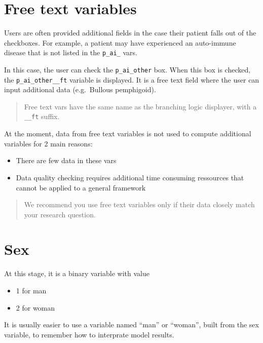 \documentclass[
]{book}
\begin{document}
\hypertarget{freetext_var}{%
\section{Free text variables}\label{freetext_var}}

Users are often provided additional fields in the case their patient
falls out of the checkboxes. For example, a patient may have experienced
an auto-immune disease that is not listed in the \texttt{p\_ai\_} vars.

In this case, the user can check the \texttt{p\_ai\_other} box. When this box is
checked, the \texttt{p\_ai\_other\_\_ft} variable is displayed. It is a free text
field where the user can input additional data (e.g.~Bullous
pemphigoid).

\begin{quote}
Free text vars have the same name as the branching logic displayer,
with a \texttt{\_\_ft} suffix.
\end{quote}

At the moment, data from free text variables is not used to compute
additional variables for 2 main reasons:

\begin{itemize}
\item
  There are few data in these vars
\item
  Data quality checking requires additional time consuming ressources
  that cannot be applied to a general framework
\end{itemize}

\begin{quote}
We recommend you use free text variables only if their data closely
match your research question.
\end{quote}

\hypertarget{sex}{%
\section{Sex}\label{sex}}

At this stage, it is a binary variable with value

\begin{itemize}
\item
  1 for man
\item
  2 for woman
\end{itemize}

It is usually easier to use a variable named ``man'' or ``woman'', built
from the sex variable, to remember how to interprate model results.
\end{document}
